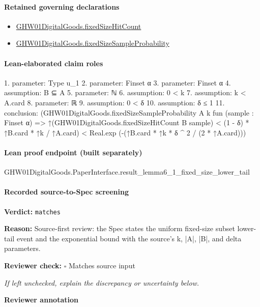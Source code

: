 \documentclass[10pt]{article}
\newcommand{\reviewerbox}{%
  \par\noindent\fbox{\parbox{0.96\linewidth}{\rule{0pt}{0.38in}}}\par
}
\newcommand{\reviewmatch}[1]{%
  \par\noindent\textbf{Reviewer check:} $\square$\; #1\par
  \noindent\emph{If left unchecked, explain the discrepancy or uncertainty below.}\par
}
\begin{document}
\paragraph{Retained governing declarations}
\begin{itemize}\raggedright
\item \hyperlink{governing-declaration-2fa55a027748cd70}{GHW01\allowbreak{}Digital\allowbreak{}Goods.\allowbreak{}fixed\allowbreak{}Size\allowbreak{}Hit\allowbreak{}Count}
\item \hyperlink{governing-declaration-b62204016e8ea564}{GHW01\allowbreak{}Digital\allowbreak{}Goods.\allowbreak{}fixed\allowbreak{}Size\allowbreak{}Sample\allowbreak{}Probability}
\end{itemize}
\paragraph{Lean-elaborated claim roles}\begin{ReviewVerbatim}
1. parameter: Type u_1
2. parameter: Finset α
3. parameter: Finset α
4. assumption: B ⊆ A
5. parameter: ℕ
6. assumption: 0 < k
7. assumption: k < A.card
8. parameter: ℝ
9. assumption: 0 < δ
10. assumption: δ ≤ 1
11. conclusion: (GHW01DigitalGoods.fixedSizeSampleProbability A k fun (sample : Finset α) =>
    ↑(GHW01DigitalGoods.fixedSizeHitCount B sample) < (1 - δ) * ↑B.card * ↑k / ↑A.card) <
  Real.exp (-(↑B.card * ↑k * δ ^ 2 / (2 * ↑A.card)))
\end{ReviewVerbatim}

\paragraph{Lean proof endpoint (built separately)}\begin{ReviewVerbatim}
GHW01DigitalGoods.PaperInterface.result_lemma6_1_fixed_size_lower_tail
\end{ReviewVerbatim}

\paragraph{Recorded source-to-Spec screening}
\textbf{Verdict:} \texttt{matches}
\\
{\raggedright
\textbf{Reason:} Source-\allowbreak{}first review:\allowbreak{} the Spec states the uniform fixed-\allowbreak{}size subset lower-\allowbreak{}tail event and the exponential bound with the source's k, |A|, |B|, and delta parameters.\allowbreak{}
\par}
\reviewmatch{Matches source input}
\noindent\textbf{Reviewer annotation}\par
\reviewerbox
\clearpage
\hypertarget{source-claim-dbcf1d32b28d9965}{}
\end{document}
